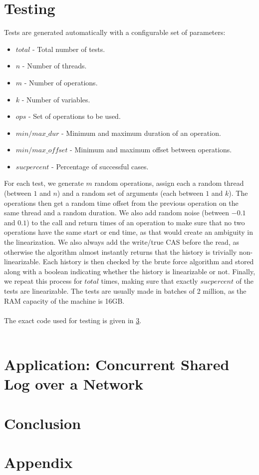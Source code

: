 \documentclass[oneside, a4paper, onecolumn, 10pt]{article}
\begin{document}
\section{Testing}
Tests are generated automatically with a configurable set of parameters:
\begin{itemize}
  \item $total$ - Total number of tests. 
  \item $n$ - Number of threads.
  \item $m$ - Number of operations.
  \item $k$ - Number of variables.
  \item $ops$ - Set of operations to be used.
  \item $min/max\_dur$ - Minimum and maximum duration of an operation.
  \item $min/max\_offset$ - Minimum and maximum offset between operations.
  \item $sucpercent$ - Percentage of successful cases.
\end{itemize}
For each test, we generate $m$ random operations, assign each a random thread (between $1$ and $n$) and a random set of arguments (each between $1$ and $k$). The operations then get a random time offset from the previous operation on the same thread and a random duration. We also add random noise (between $-0.1$ and $0.1$) to the call and return times of an operation to make sure that no two operations have the same start or end time, as that would create an ambiguity in the linearization. We also always add the write/true CAS before the read, as otherwise the algorithm almost instantly returns that the history is trivially non-linearizable. Each history is then checked by the brute force algorithm and stored along with a boolean indicating whether the history is linearizable or not. Finally, we repeat this process for $total$ times, making sure that exactly $sucpercent$ of the tests are linearizable. The tests are usually made in batches of 2 million, as the RAM capacity of the machine is 16GB. 
\\\\
The exact code used for testing is given in \ref{}. 
\\\\
\section{Application: Concurrent Shared Log over a Network}
\section{Conclusion}

\newpage


\newpage
\appendix

\section{Appendix}
\label{sec:appendix}
\end{document}
